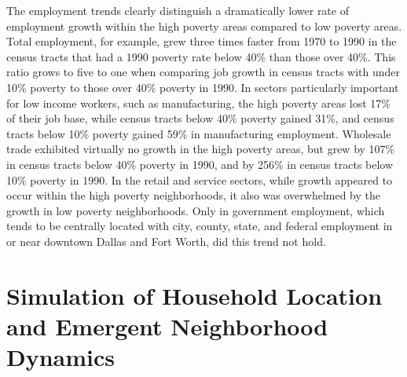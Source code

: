 \documentclass[12pt,a4paper]{article}
\begin{document}
The employment trends clearly distinguish a dramatically lower
rate of employment growth within the high poverty areas compared
to low poverty areas.  Total employment, for example, grew three
times faster from 1970 to 1990 in the census tracts that had a
1990 poverty rate below 40\% than those over 40\%.  This ratio
grows to five to one when comparing job growth in census tracts
with under 10\% poverty to those over 40\% poverty in 1990.  In
sectors particularly important for low income workers, such as
manufacturing, the high poverty areas lost 17\% of their job base,
while census tracts below 40\% poverty gained 31\%, and census
tracts below 10\% poverty gained 59\% in manufacturing employment.
Wholesale trade exhibited virtually no growth in the high poverty
areas, but grew by 107\% in census tracts below 40\% poverty in
1990, and by 256\% in census tracts below 10\% poverty in 1990.
In the retail and service sectors, while  growth appeared to occur
within the high poverty neighborhoods, it also was overwhelmed by
the growth in low poverty neighborhoods.  Only in government
employment, which tends to be centrally located with city, county,
state, and federal employment in or near downtown Dallas and Fort
Worth, did this trend not hold.

\section{Simulation of Household Location and Emergent
Neighborhood Dynamics}
\end{document}
